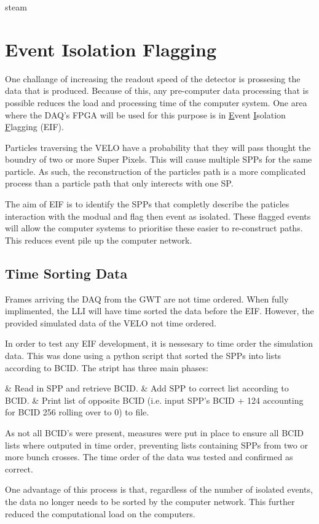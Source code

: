 steam
\section{Event Isolation Flagging}
	
	One challange of increasing the readout speed of the detector is prossesing the data that is produced.
	Because of this, any pre-computer data processing that is possible reduces the load and processing time of the computer system.
	One area where the DAQ's FPGA will be used for this purpose is in \underline{E}vent \underline{I}solation \underline{F}lagging (EIF).
	\par
	Particles traversing the VELO have a probability that they will pass thought the boundry of two or more Super Pixels.
	This will cause multiple SPPs for the same particle.
	As such, the reconstruction of the particles path is a more complicated process than a particle path that only interects with one SP.
	\par
	The aim of EIF is to identify the SPPs that completly describe the paticles interaction with the modual and flag then event as isolated.
	These flagged events will allow the computer systems to prioritise these easier to re-construct paths.
	This reduces event pile up the computer network.

	\subsection{Time Sorting Data}

		Frames arriving the DAQ from the GWT are not time ordered.
		When fully implimented, the LLI will have time sorted the data before the EIF.
		However, the provided simulated data of the VELO not time ordered.
		\par
		In order to test any EIF development, it is nessesary to time order the simulation data.
		This was done using a python script that sorted the SPPs into lists according to BCID.
		The stript has three main phases:

		\begin{easylist}
			& Read in SPP and retrieve BCID.
			& Add SPP to correct list according to BCID.
			& Print list of opposite BCID (i.e. input SPP's BCID + 124 accounting for BCID 256 rolling over to 0) to file.
		\end{easylist}

		As not all BCID's were present, measures were put in place to ensure all BCID lists where outputed in time order, preventing lists containing SPPs from two or more bunch crosses. The time order of the data was tested and confirmed as correct.
		\par
		One advantage of this process is that, regardless of the number of isolated events, the data no longer needs to be sorted by the computer network.
		This further reduced the computational load on the computers.

